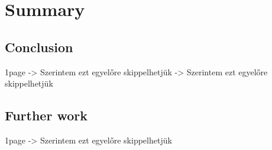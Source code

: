 \chapter{Summary}

\section{Conclusion}
	1page  -> Szerintem ezt egyelőre skippelhetjük -> Szerintem ezt egyelőre skippelhetjük
\section{Further work}
	1page -> Szerintem ezt egyelőre skippelhetjük